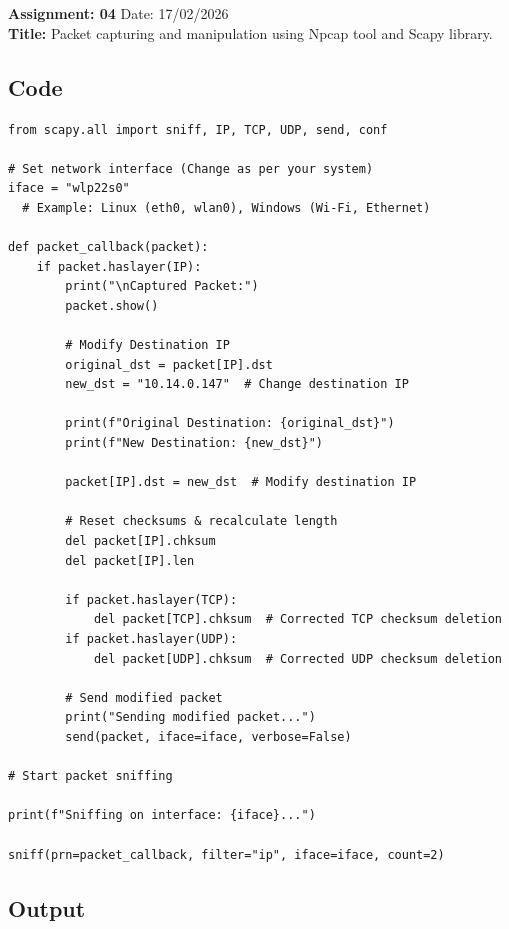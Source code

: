 \section{}
\noindent \textbf{Assignment: 04}
\hfill Date: 17/02/2026 \\
\noindent
\textbf{Title:} Packet capturing and manipulation using Npcap tool and Scapy library.

\subsection*{Code}

\begin{lstlisting}[style=mypython, caption={NcapScapyScript.py}, label={code:A-4-scapy_ncap_script}]
from scapy.all import sniff, IP, TCP, UDP, send, conf

# Set network interface (Change as per your system)
iface = "wlp22s0"
  # Example: Linux (eth0, wlan0), Windows (Wi-Fi, Ethernet)

def packet_callback(packet):
    if packet.haslayer(IP):
        print("\nCaptured Packet:")
        packet.show()

        # Modify Destination IP
        original_dst = packet[IP].dst
        new_dst = "10.14.0.147"  # Change destination IP

        print(f"Original Destination: {original_dst}")
        print(f"New Destination: {new_dst}")

        packet[IP].dst = new_dst  # Modify destination IP
        
        # Reset checksums & recalculate length
        del packet[IP].chksum
        del packet[IP].len

        if packet.haslayer(TCP):
            del packet[TCP].chksum  # Corrected TCP checksum deletion
        if packet.haslayer(UDP):
            del packet[UDP].chksum  # Corrected UDP checksum deletion

        # Send modified packet
        print("Sending modified packet...")
        send(packet, iface=iface, verbose=False)

# Start packet sniffing

print(f"Sniffing on interface: {iface}...")

sniff(prn=packet_callback, filter="ip", iface=iface, count=2)
\end{lstlisting}

\subsection*{Output}

